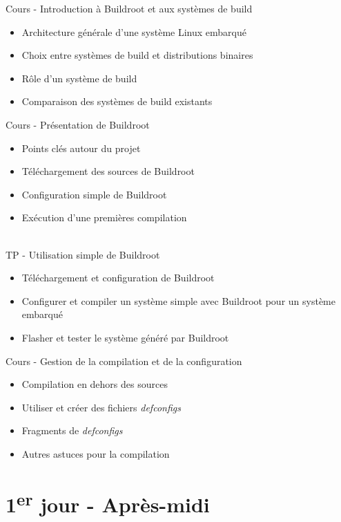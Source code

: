 \documentclass[a4paper,12pt,obeyspaces,spaces,hyphens]{article}
\begin{document}
\feagendatwocolumn
{Cours - Introduction à Buildroot et aux systèmes de build}
{
  \begin{itemize}
  \item Architecture générale d'une système Linux embarqué
  \item Choix entre systèmes de build et distributions binaires
  \item Rôle d'un système de build
  \item Comparaison des systèmes de build existants
  \end{itemize}
}
{Cours - Présentation de Buildroot}
{
  \begin{itemize}
  \item Points clés autour du projet
  \item Téléchargement des sources de Buildroot
  \item Configuration simple de Buildroot
  \item Exécution d'une premières compilation
  \end{itemize}
}
\\
\feagendatwocolumn
{TP - Utilisation simple de Buildroot}
{
  \begin{itemize}
  \item Téléchargement et configuration de Buildroot
  \item Configurer et compiler un système simple avec Buildroot pour
    un système embarqué
  \item Flasher et tester le système généré par Buildroot
  \end{itemize}
}
{Cours - Gestion de la compilation et de la configuration}
{
  \begin{itemize}
  \item Compilation en dehors des sources
  \item Utiliser et créer des fichiers {\em defconfigs}
  \item Fragments de {\em defconfigs}
  \item Autres astuces pour la compilation
  \end{itemize}
}


\section{1\textsuperscript{er} jour - Après-midi}
\end{document}

